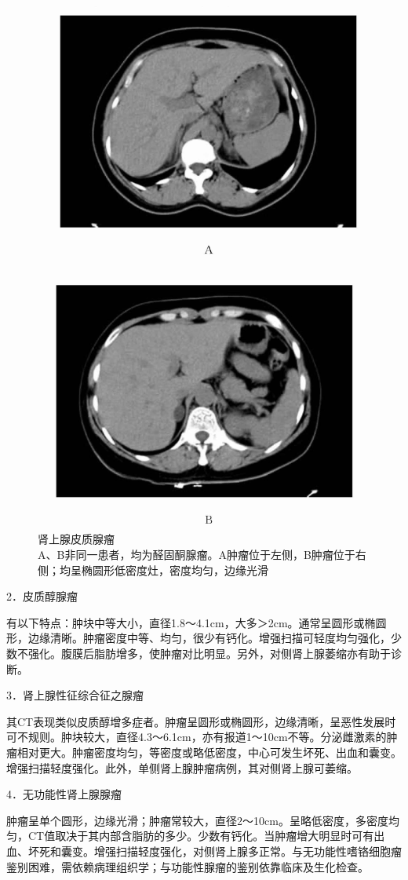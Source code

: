 \begin{figure}[!htbp]
 \centering
 \includegraphics[width=.7\textwidth,height=\textheight,keepaspectratio]{./images/Image00346.jpg}
 \captionsetup{justification=centering}
 \caption{肾上腺皮质腺瘤\\{\small A、B非同一患者，均为醛固酮腺瘤。A肿瘤位于左侧，B肿瘤位于右侧；均呈椭圆形低密度灶，密度均匀，边缘光滑}}
 \label{fig16-2}
  \end{figure} 

2．皮质醇腺瘤

有以下特点：肿块中等大小，直径1.8～4.1cm，大多＞2cm。通常呈圆形或椭圆形，边缘清晰。肿瘤密度中等、均匀，很少有钙化。增强扫描可轻度均匀强化，少数不强化。腹膜后脂肪增多，使肿瘤对比明显。另外，对侧肾上腺萎缩亦有助于诊断。

3．肾上腺性征综合征之腺瘤

其CT表现类似皮质醇增多症者。肿瘤呈圆形或椭圆形，边缘清晰，呈恶性发展时可不规则。肿块较大，直径4.3～6.1cm，亦有报道1～10cm不等。分泌雌激素的肿瘤相对更大。肿瘤密度均匀，等密度或略低密度，中心可发生坏死、出血和囊变。增强扫描轻度强化。此外，单侧肾上腺肿瘤病例，其对侧肾上腺可萎缩。

4．无功能性肾上腺腺瘤

肿瘤呈单个圆形，边缘光滑；肿瘤常较大，直径2～10cm。呈略低密度，多密度均匀，CT值取决于其内部含脂肪的多少。少数有钙化。当肿瘤增大明显时可有出血、坏死和囊变。增强扫描轻度强化，对侧肾上腺多正常。与无功能性嗜铬细胞瘤鉴别困难，需依赖病理组织学；与功能性腺瘤的鉴别依靠临床及生化检查。

